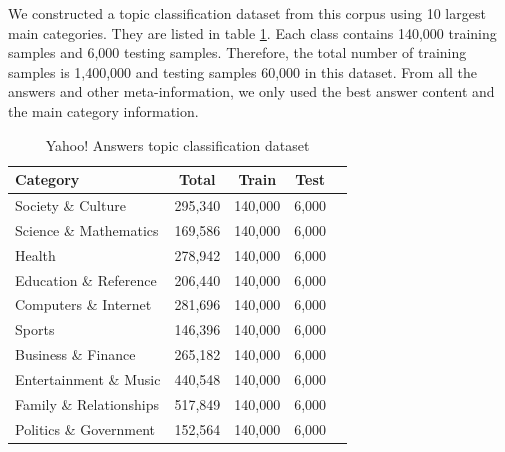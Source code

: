 \documentclass{article}
\begin{document}
\begin{CJK}{UTF8}{gbsn}
We constructed a topic classification dataset from this corpus using 10 largest main categories. They are listed in table \ref{tab:yadb}. Each class contains 140,000 training samples and 6,000 testing samples. Therefore, the total number of training samples is 1,400,000 and testing samples 60,000 in this dataset. From all the answers and other meta-information, we only used the best answer content and the main category information. %

\begin{table}[ht]
  \caption{Yahoo! Answers topic classification dataset}
  \label{tab:yadb}
  \begin{center}
    \begin{tabular}{lcccc}
      \hline
      \abovespace\belowspace
      Category & Total & Train & Test \\
      \hline
      \abovespace
      Society \& Culture & 295,340 & 140,000 & 6,000 \\
      Science \& Mathematics & 169,586 & 140,000 & 6,000 \\
      Health & 278,942 & 140,000 & 6,000 \\
      Education \& Reference & 206,440 & 140,000 & 6,000 \\
      Computers \& Internet & 281,696 & 140,000 & 6,000 \\
      Sports & 146,396 & 140,000 & 6,000 \\
      Business \& Finance & 265,182 & 140,000 & 6,000 \\
      Entertainment \& Music & 440,548 & 140,000 & 6,000 \\
      Family \& Relationships & 517,849 & 140,000 & 6,000 \\
      \belowspace
      Politics \& Government & 152,564 & 140,000 & 6,000 \\
      \hline
    \end{tabular}
  \end{center}
\end{table}


\end{CJK}
\end{document}
